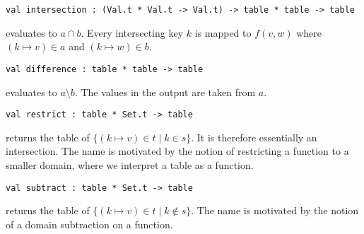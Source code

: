 \begin{cluster}
\label{grp:grm:aug-ordtable-interface::intersection}

\begin{gram}[intersection]
\label{grm:aug-ordtable-interface::intersection}
\begin{verbatim}
val intersection : (Val.t * Val.t -> Val.t) -> table * table -> table
\end{verbatim}
 evaluates to $a \cap b$. Every intersecting key
$k$ is mapped to $f(v,w)$ where $(k \mapsto v) \in a$ and $(k \mapsto w) \in b$.

\end{gram}
\end{cluster}

\begin{cluster}
\label{grp:grm:aug-ordtable-interface::difference}

\begin{gram}[difference]
\label{grm:aug-ordtable-interface::difference}
\begin{verbatim}
val difference : table * table -> table
\end{verbatim}
 evaluates to $a \setminus b$. The values in the output
are taken from $a$.

\end{gram}
\end{cluster}

\begin{cluster}
\label{grp:grm:aug-ordtable-interface::restrict}

\begin{gram}[restrict]
\label{grm:aug-ordtable-interface::restrict}
\begin{verbatim}
val restrict : table * Set.t -> table
\end{verbatim}
 returns the table of $\{(k \mapsto v) \in t \mathbin| k \in s\}$.
It is therefore essentially an intersection. The name is motivated by the
notion of restricting a function to a smaller domain, where we interpret a table
as a function.

\end{gram}
\end{cluster}

\begin{cluster}
\label{grp:grm:aug-ordtable-interface::subtract}

\begin{gram}[subtract]
\label{grm:aug-ordtable-interface::subtract}
\begin{verbatim}
val subtract : table * Set.t -> table
\end{verbatim}
 returns the table of
$\{(k \mapsto v) \in t \mathbin| k \not\in s\}$.
The name is motivated by the notion of a domain subtraction on a function.

\end{gram}
\end{cluster}

